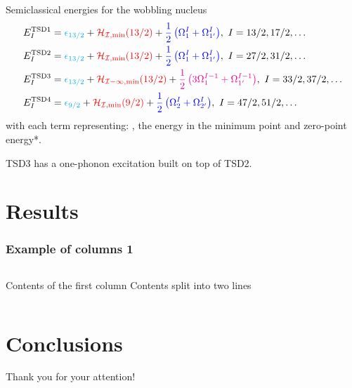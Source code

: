 \documentclass{beamer}
\begin{document}
\begin{frame}{Semiclassical energies for the wobbling nucleus}
  \begin{align}
    E_I^\text{TSD1}&={\color{cyan}\epsilon_{13/2}}+{\color{red}\mathcal{H_{I,\text{min}}}(13/2)}+{\color{blue}\frac{1}{2}\left(\Omega_1^I+\Omega_{1'}^I\right)},\ I=13/2, 17/2,\dots\\
    E_I^\text{TSD2}&={\color{cyan}\epsilon_{13/2}}+{\color{red}\mathcal{H_{I,\text{min}}}(13/2)}+{\color{blue}\frac{1}{2}\left(\Omega_1^I+\Omega_{1'}^I\right)},\ I=27/2, 31/2,\dots\\
    E_I^\text{TSD3}&={\color{cyan}\epsilon_{13/2}}+{\color{red}\mathcal{H_{I-1,\text{min}}}(13/2)}+{\color{magenta}\frac{1}{2}\left(3\Omega_1^{I-1}+\Omega_{1'}^{I-1}\right)},\ I=33/2, 37/2,\dots\\
    E_I^\text{TSD4}&={\color{cyan}\epsilon_{9/2}}+{\color{red}\mathcal{H_{I,\text{min}}}(9/2)}+{\color{blue}\frac{1}{2}\left(\Omega_2^I+\Omega_{2'}^I\right)},\ I=47/2, 51/2,\dots
  \end{align} 
  with each term representing: {\color{cyan}{single particle energy}}, the {\color{red}energy in the minimum point} and {\color{blue}zero-point energy}*.
  \par {\color{magenta} TSD3 has a one-phonon excitation built on top of TSD2.}
\end{frame}

\section{Results}  

\begin{frame}
    \frametitle{Example of columns 1}
    \begin{columns}[c] %
     Contents of the first column
     Contents split \newline into two lines
    \end{columns}
\end{frame}

\section{Conclusions}

  \begin{frame}
  \centering
    \Large{Thank you for your attention!}
  \end{frame}
\end{document}
